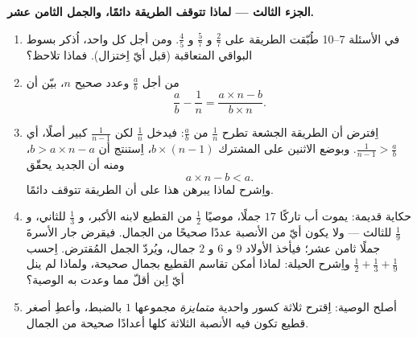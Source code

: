 \begin{problem}
\medskip
\noindent\textbf{الجزء الثالث --- لماذا تتوقف الطريقة دائمًا، والجمل
الثامن عشر.}
\begin{enumerate}[resume]
  \item في الأسئلة 7--10 طُبّقت الطريقة على $\frac27$
        و $\frac57$ و $\frac45$. ومن أجل كل واحد، اُذكر بسوط
        البواقي المتعاقبة (قبل أيّ اِختزال).
        فماذا تلاحظ؟
  \item من أجل  $\frac ab$ وعدد صحيح $n$، بيّن
        أن
        \[
        \frac{a}{b} - \frac{1}{n}
        = \frac{a \times n - b}{b \times n} .
        \]
  \item اِفترض أن الطريقة الجشعة تطرح $\frac1n$ من
        $\frac ab$: فيدخل $\frac1n$ لكن $\frac{1}{n-1}$
        كبير أصلًا، أي $\frac{1}{n-1} > \frac ab$. وبوضع الاثنين
        على  المشترك $b \times (n - 1)$، اِستنتج
        أن $b > a \times n - a$، ومنه أن  الجديد
        يحقّق
        \[
        a \times n - b < a .
        \]
        واِشرح لماذا يبرهن هذا على أن الطريقة تتوقف دائمًا.
  \item حكاية قديمة: يموت أب تاركًا $17$ جملًا، موصيًا
         $\frac12$ من القطيع لابنه الأكبر، و $\frac13$
        للثاني، و $\frac19$ للثالث --- ولا يكون أيّ من
        الأنصبة عددًا صحيحًا من الجمال. فيقرض جار
        الأسرةَ جملًا ثامن عشر؛ فيأخذ الأولاد $9$ و $6$
        و $2$ جمال، ويُردّ الجمل المُقترض. اِحسب
        $\frac12 + \frac13 + \frac19$ واِشرح الحيلة: لماذا
        أمكن تقاسم القطيع بجمال صحيحة، ولماذا لم ينل أيّ
        اِبن أقلّ مما وعدت به الوصية؟
  \item أصلح الوصية: اِقترح ثلاثة كسور واحدية
        \emph{متمايزة} مجموعها $1$ بالضبط، وأعطِ
        أصغر  قطيع تكون فيه الأنصبة الثلاثة كلها أعدادًا
        صحيحة من الجمال.
\end{enumerate}
\end{problem}
